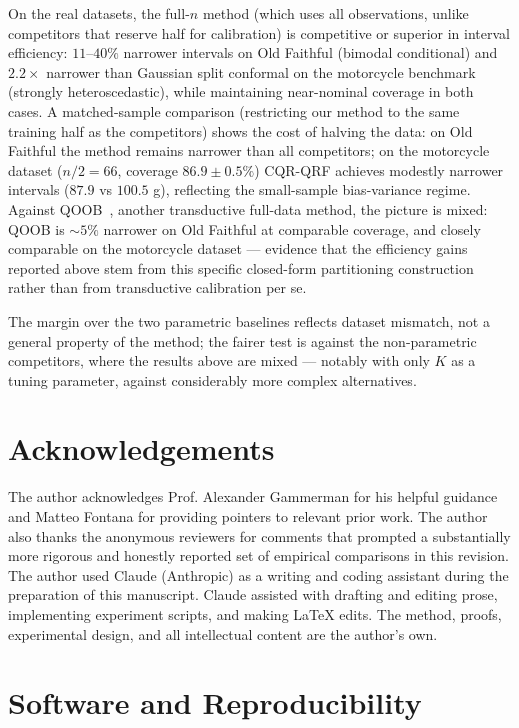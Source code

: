 \documentclass[11pt]{article}
\begin{document}
On the real datasets, the full-$n$ method (which uses all observations, unlike
competitors that reserve half for calibration) is competitive or superior in interval
efficiency: $11$--$40\%$ narrower intervals on Old Faithful (bimodal conditional) and
$2.2\times$ narrower than Gaussian split conformal on the motorcycle benchmark
(strongly heteroscedastic), while maintaining near-nominal coverage in both cases.
A matched-sample comparison (restricting our method to the same training half as the
competitors) shows the cost of halving the data: on Old Faithful the method remains
narrower than all competitors; on the motorcycle dataset ($n/2=66$, coverage
$86.9 \pm 0.5\%$) CQR-QRF achieves modestly narrower intervals ($87.9$ vs $100.5$ g),
reflecting the small-sample bias-variance regime.
Against QOOB~\citep{GuptaEtAl2022}, another transductive full-data method, the
picture is mixed: QOOB is $\sim\!5\%$ narrower on Old Faithful at comparable
coverage, and closely comparable on the motorcycle dataset --- evidence that the
efficiency gains reported above stem from this specific closed-form partitioning
construction rather than from transductive calibration per se.

The margin over the two parametric baselines reflects dataset mismatch, not a
general property of the method; the fairer test is against the non-parametric
competitors, where the results above are mixed --- notably with only $K$ as a
tuning parameter, against considerably more complex alternatives.

\section*{Acknowledgements}

The author acknowledges Prof. Alexander Gammerman for his helpful guidance and Matteo Fontana
for providing pointers to relevant prior work.
The author also thanks the anonymous reviewers for comments that prompted a substantially
more rigorous and honestly reported set of empirical comparisons in this revision.
The author used Claude (Anthropic) as a writing and coding assistant during the
preparation of this manuscript.
Claude assisted with drafting and editing prose, implementing experiment scripts,
and making \LaTeX{} edits.
The method, proofs, experimental design, and all intellectual content are the
author's own.

\section*{Software and Reproducibility}
\end{document}
